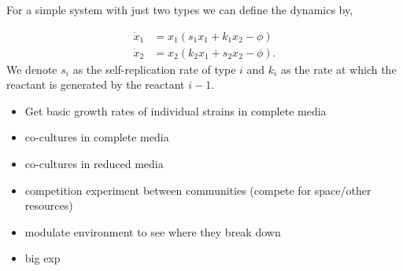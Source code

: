 For a simple system with just two types we can define the dynamics by,

\begin{align}
	\dot{x}_1 &=  x_1 (s_1 x_1 + k_1 x_2 - \phi) \nonumber \\
	\dot{x}_2 &=  x_2 (k_2 x_1 + s_2 x_2 - \phi).
\end{align}
We denote $s_i$ as the self-replication rate of type $i$ and $k_i$ as the rate at which the reactant is generated by the reactant $i-1$.

\begin{itemize}
	\item Get basic growth rates of individual strains in complete media
	\item co-cultures in complete media
	\item co-cultures in reduced media
	\item competition experiment between communities (compete for space/other resources)
	\item modulate environment to see where they break down
	\item big exp
\end{itemize}
